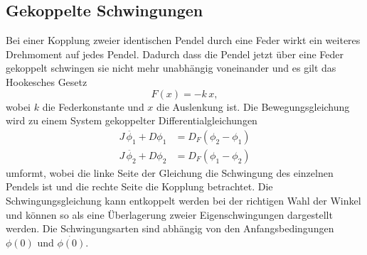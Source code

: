 \subsection{Gekoppelte Schwingungen} %
\label{sub:Schwingungen}
 Bei einer Kopplung zweier identischen Pendel durch eine Feder wirkt ein weiteres Drehmoment auf jedes Pendel.
 Dadurch dass die Pendel jetzt über eine Feder gekoppelt schwingen sie nicht mehr unabhängig voneinander und es gilt das Hookesches Gesetz
 \begin{equation*}
     F(x) = -k \, x ,
 \end{equation*}
 wobei $k$ die Federkonstante und $x$ die Auslenkung ist.
 Die Bewegungsgleichung wird zu einem System gekoppelter Differentialgleichungen
 \begin{align}
     J \, \ddot{\phi_1} + D \phi_1 &= D_F (\phi_2 - \phi_1) \\
     J \, \ddot{\phi_2} + D \phi_2 &= D_F (\phi_1 - \phi_2)
 \end{align}
 umformt, wobei die linke Seite der Gleichung die Schwingung des einzelnen Pendels ist und die rechte Seite die Kopplung betrachtet.
 Die Schwingungsgleichung kann entkoppelt werden bei der richtigen Wahl der Winkel und können so als eine Überlagerung zweier Eigenschwingungen dargestellt werden.
 Die Schwingungsarten sind abhängig von den Anfangsbedingungen $\phi(0)$ und $\dot{\phi(0)}$. 

